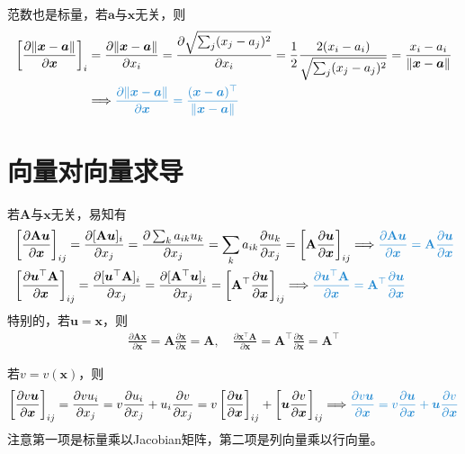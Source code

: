 \documentclass{ctexart}
\newcommand{\blue}[1]{\textcolor{Solarized-blue}{#1}}
\theoremstyle{definition}
\def \av {\bm{a}}
\def \uv {\bm{u}}
\def \xv {\bm{x}}
\def \Av {\mathbf{A}}
\begin{document}
范数也是标量，若$\av$与$\xv$无关，则
\begin{align} \label{eq: norm}
    \left[ \frac{\partial \| \xv - \av \|}{\partial \xv} \right]_i & = \frac{\partial \| \xv - \av \|}{\partial x_i} = \frac{\partial \sqrt{\sum_j (x_j - a_j)^2}}{\partial x_i} = \frac{1}{2} \frac{2 (x_i - a_i)}{\sqrt{\sum_j (x_j - a_j)^2}} = \frac{x_i - a_i}{\| \xv - \av \|} \\
                                                                   & \Longrightarrow \blue{\frac{\partial \| \xv - \av \|}{\partial \xv} = \frac{(\xv - \av)^\top}{\| \xv - \av \|}} \nonumber
\end{align}


\section{向量对向量求导}

若$\Av$与$\xv$无关，易知有
\begin{align*}
     & \left[ \frac{\partial \Av \uv}{\partial \xv} \right]_{ij} = \frac{\partial [\Av \uv]_i}{\partial x_j} = \frac{\partial \sum_k a_{ik} u_k}{\partial x_j} = \sum_k a_{ik} \frac{\partial u_k}{\partial x_j} = \left[ \Av \frac{\partial \uv}{\partial \xv} \right]_{ij} \Longrightarrow \blue{\frac{\partial \Av \uv}{\partial \xv} = \Av \frac{\partial \uv}{\partial \xv}} \\
     & \left[ \frac{\partial \uv^\top \Av}{\partial \xv} \right]_{ij} = \frac{\partial [\uv^\top \Av]_i}{\partial x_j} = \frac{\partial [\Av^\top \uv]_i}{\partial x_j} = \left[ \Av^\top \frac{\partial \uv}{\partial \xv} \right]_{ij} \Longrightarrow \blue{\frac{\partial \uv^\top \Av}{\partial \xv} = \Av^\top \frac{\partial \uv}{\partial \xv}}
\end{align*}
特别的，若$\uv = \xv$，则
\begin{align*}
    \frac{\partial \Av \xv}{\partial \xv} = \Av \frac{\partial \xv}{\partial \xv} = \Av, \quad \frac{\partial \xv^\top \Av}{\partial \xv} = \Av^\top \frac{\partial \xv}{\partial \xv} = \Av^\top
\end{align*}

若$v = v(\xv)$，则
\begin{align*}
    \left[ \frac{\partial v \uv}{\partial \xv} \right]_{ij} = \frac{\partial v u_i}{\partial x_j} = v \frac{\partial u_i}{\partial x_j} + u_i \frac{\partial v}{\partial x_j} = v \left[ \frac{\partial \uv}{\partial \xv} \right]_{ij} + \left[ \uv \frac{\partial v}{\partial \xv} \right]_{ij} \Longrightarrow \blue{\frac{\partial v \uv}{\partial \xv} = v \frac{\partial \uv}{\partial \xv} + \uv \frac{\partial v}{\partial \xv}}
\end{align*}
注意第一项是标量乘以Jacobian矩阵，第二项是列向量乘以行向量。
\end{document}
